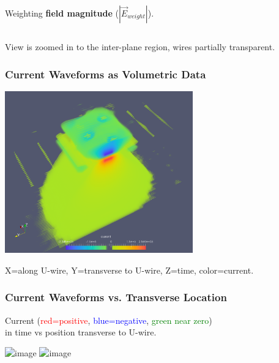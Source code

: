 \documentclass[xcolor=dvipsnames]{beamer}
\begin{document}
\begin{frame}
\begin{columns}
\begin{column}{0.5\textwidth}
\begin{center}
        Weighting \textbf{field magnitude} ($|\vec{E}_{weight}|$).
      \end{center}      
    \end{column}
  \end{columns}
  \begin{center}
    View is zoomed in to the inter-plane region, wires partially transparent.
  \end{center}
\end{frame}


\begin{frame}
  \frametitle{Current Waveforms as Volumetric Data}
  \begin{center}
    \includegraphics[height=7cm,clip,trim=0cm 0cm 0cm 0cm]{current-iso.png}

    \footnotesize
    X=along U-wire, Y=transverse to U-wire, Z=time, color=current.
  \end{center}

\end{frame}

\begin{frame}
  \frametitle{Current Waveforms vs. Transverse Location}
  \begin{center}
    Current (\textcolor{red}{red=positive}, \textcolor{blue}{blue=negative}, \textcolor{green}{green near zero}) \\
    in time vs position transverse to U-wire.

    \includegraphics<1>[height=5cm,clip,trim=0cm 8cm 0cm 8cm]{current-slice.png}
    \includegraphics<2>[height=5cm,clip,trim=0cm 8cm 0cm 8cm]{current-3d.png}
    
  \end{center}
  
\end{frame}
\end{document}
